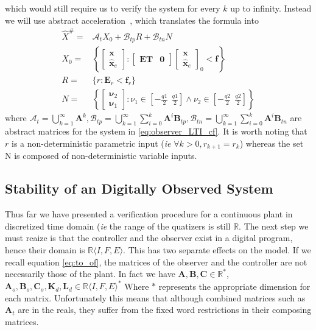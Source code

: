 \documentclass[twocolumn]{autart}    %
\newcommand{\mat}[1]{\boldsymbol{#1}}
\renewcommand{\vec}[1]{\boldsymbol{#1}}
\begin{document}
which would still require us to verify the system for every $k$ up to infinity. Instead we will use abstract acceleration~\cite{}, which translates the formula into
\begin{align}
\label{eq:aa_observer_LTI_cf}
\hat{X}^\#
=&\mathcal{A}_t X_0+\mathcal{B}_{tp} R + \mathcal{B}_{tn} N\\
X_0 =&\left \{ \left[\begin{array}{c}\vec{x}\\ \hat{\vec{x}}_e \end{array}\right] :
 \left [\begin{array}{cc}\mat{E}\mat{T}&\mat{0}\end{array}\right] \left [\begin{array}{c}\vec{x}\\ \hat{\vec{x}}_e \end{array}\right]_0<\mat{f} \right\}\nonumber\\
 R =&\{r : \mat{E}_r < \vec{f}_r \}\nonumber\\
 N=&\left \{ \left[\begin{array}{c}\vec{\nu}_2\\ \vec{\nu}_1\end{array}\right] : \nu_1 \in \left[-\frac{q1}{2}\ \ \frac{q1}{2}\right] \wedge \nu_2 \in \left[-\frac{q2}{2}\ \ \frac{q2}{2}\right]  \right \}\nonumber
\end{align}
%
where $\mathcal{A}_t=\bigcup_{k=1}^\infty \mat{A}^k,
\mathcal{B}_{tp}=\bigcup_{k=1}^\infty \sum_{i=0}^k\mat{A}^i\mat{B}_{tp},
\mathcal{B}_{tn}=\bigcup_{k=1}^\infty \sum_{i=0}^k\mat{A}^i\mat{B}_{tn}$ are
abstract matrices for the system in \eqref{eq:observer_LTI_cf}.  It is worth
noting that $r$ is a non-deterministic parametric input (\emph{ie} $\forall
k>0, r_{k+1} =r_k$) whereas the set N is composed of non-deterministic
variable inputs.

\subsection{Stability of an Digitally Observed System}\label{sec:cof_fwl_stability}

Thus far we have presented a verification procedure for a continuous plant
in discretized time domain (\emph{ie} the range of the quatizers is still
$\mathbb{R}$.  The next step we must reaize is that the controller and the
observer exist in a digital program, hence their domain is
$\mathbb{R}\langle I,F,E\rangle$.  This has two separate effects on the
model.  If we recall equation \eqref{eq:to_of}, the matrices of the observer
and the controller are not necessarily those of the plant.  In fact we have
$\mat{A},\mat{B},\mat{C} \in \mathbb{R}^*$, $\mat{A}_o,\mat{B}_o,\mat{C}_o,
\mat{K}_d, \mat{L}_d \in \mathbb{R}\langle I,F,E\rangle^*$ Where $*$
represents the appropriate dimension for each matrix.  Unfortunately this
means that although combined matrices such as $\mat{A}_t$ are in the reals,
they suffer from the fixed word restrictions in their composing matrices.
\end{document}
